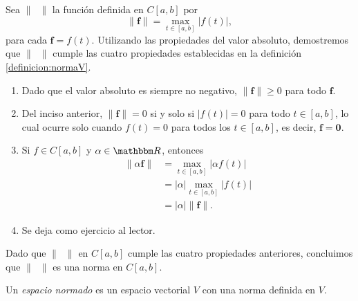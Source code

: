 \begin{examplebox}{}{}
    Sea $\| \phantom{x} \|$ la función definida en $C[a, b]$ por
    $$\| \mathbf{f} \| = \max_{t \in [a, b]} |f(t)|,$$
    para cada $\mathbf{f} = f(t)$. Utilizando las propiedades del valor absoluto, demostremos que $\| \phantom{x} \|$ cumple las cuatro propiedades establecidas en la definición \ref{definicion:normaV}.
    \begin{enumerate}[label=\roman*), topsep=6pt, itemsep=0pt]
        \item Dado que el valor absoluto es siempre no negativo, $\| \mathbf{f} \| \geq 0$ para todo $\mathbf{f}$.
        \item Del inciso anterior, $\| \mathbf{f} \| = 0$ si y solo si $|f(t)| = 0$ para todo $t \in [a, b]$, lo cual ocurre solo cuando $f(t) = 0$ para todos los $t \in [a, b]$, es decir, $\mathbf{f} = \mathbf{0}$.
        \item Si $f \in C[a, b]$ y $\alpha \in \RR$, entonces
        \begin{align*}
            \| \alpha \mathbf{f} \| & = \max_{t \in [a, b]} |\alpha f(t)| \\
            & = |\alpha| \max_{t \in [a, b]} |f(t)| \\
            & = |\alpha| \| \mathbf{f} \|.
        \end{align*}
        \item Se deja como ejercicio al lector.
    \end{enumerate}
    Dado que $\| \phantom{x} \|$ en $C[a, b]$ cumple las cuatro propiedades anteriores, concluimos que $\| \phantom{x} \|$ es una norma en $C[a, b]$.
\end{examplebox}

\newpage

\begin{definicion}{}{}
    Un \emph{espacio normado} es un espacio vectorial $V$ con una norma definida en $V$.
\end{definicion}

\newpage

